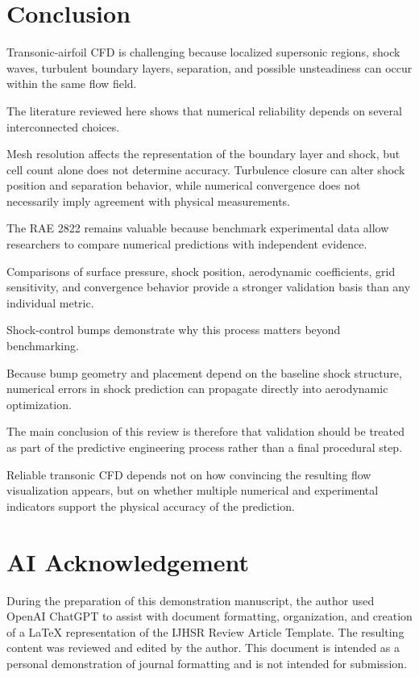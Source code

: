 \documentclass[10pt]{article}
\begin{document}
\section{Conclusion}

Transonic-airfoil CFD is challenging because localized supersonic
regions, shock waves, turbulent boundary layers, separation, and
possible unsteadiness can occur within the same flow field.

The literature reviewed here shows that numerical reliability depends
on several interconnected choices.

Mesh resolution affects the representation of the boundary layer and
shock, but cell count alone does not determine accuracy. Turbulence
closure can alter shock position and separation behavior, while
numerical convergence does not necessarily imply agreement with
physical measurements.

The RAE 2822 remains valuable because benchmark experimental data allow
researchers to compare numerical predictions with independent evidence.

Comparisons of surface pressure, shock position, aerodynamic
coefficients, grid sensitivity, and convergence behavior provide a
stronger validation basis than any individual metric.

Shock-control bumps demonstrate why this process matters beyond
benchmarking.

Because bump geometry and placement depend on the baseline shock
structure, numerical errors in shock prediction can propagate directly
into aerodynamic optimization.

The main conclusion of this review is therefore that validation should
be treated as part of the predictive engineering process rather than a
final procedural step.

Reliable transonic CFD depends not on how convincing the resulting flow
visualization appears, but on whether multiple numerical and
experimental indicators support the physical accuracy of the prediction.


\section{AI Acknowledgement}

During the preparation of this demonstration manuscript, the author
used OpenAI ChatGPT to assist with document formatting, organization,
and creation of a LaTeX representation of the IJHSR Review Article
Template. The resulting content was reviewed and edited by the author.
This document is intended as a personal demonstration of journal
formatting and is not intended for submission.
\end{document}
